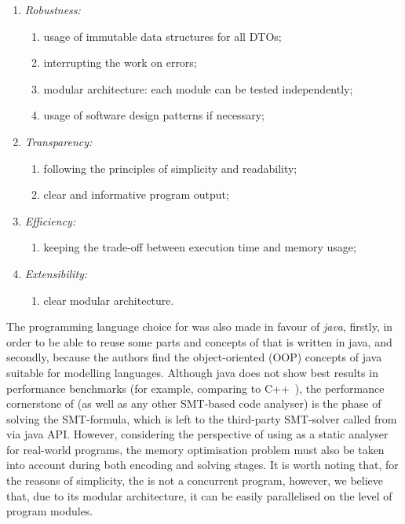 \vspace{0.5em}
\begin{enumerate}[nolistsep]
  \item \textit{Robustness:}
    \begin{enumerate}[label*=\arabic*.]
      \item usage of immutable data structures for all DTOs;
      \item interrupting the work on errors;
      \item modular architecture: each module can be tested independently;
      \item usage of software design patterns if necessary;
    \end{enumerate}
  \item \textit{Transparency:}
    \begin{enumerate}[label*=\arabic*.]
      \item following the principles of simplicity and readability;
      \item clear and informative program output;
    \end{enumerate}
  \item \textit{Efficiency:}
    \begin{enumerate}[label*=\arabic*.]%
      \item keeping the trade-off between execution time and memory usage;
    \end{enumerate}
  \item \textit{Extensibility:}
    \begin{enumerate}[label*=\arabic*.]%
      \item clear modular architecture.
    \end{enumerate}
\end{enumerate}

The programming language choice for \porthos[2] was also made in favour of \textit{java}, firstly, in order to be able to reuse some parts and concepts of \porthos[1] that is written in java, and secondly, because the authors find the object-oriented (OOP) concepts of java suitable for modelling languages.
Although java does not show best results in performance benchmarks (for example, comparing to C++~\cite{hundt2011loop, oaks2014java}), the performance cornerstone of \porthos[2] (as well as any other SMT-based code analyser) is the phase of solving the SMT-formula, which is left to the third-party SMT-solver called from \porthos[2] via java API.
However, considering the perspective of using \porthos[2] as a static analyser for real-world programs, the memory optimisation problem must also be taken into account during both encoding and solving stages.
It is worth noting that, for the reasons of simplicity, the \porthos[2] is not a concurrent program, however, we believe that, due to its modular architecture, it can be easily parallelised on the level of program modules.


